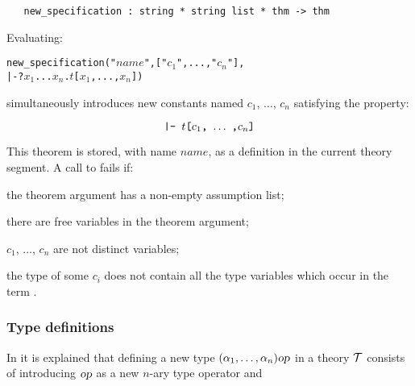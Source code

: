 \begin{holboxed}
\begin{verbatim}
   new_specification : string * string list * thm -> thm
\end{verbatim}
\end{holboxed}
%
Evaluating:
{
\newcommand{\cone}{\ensuremath{c_1}}
\newcommand{\cn}{\ensuremath{c_n}}
\newcommand{\xone}{\ensuremath{x_1}}
\newcommand{\xn}{\ensuremath{x_n}}
\begin{alltt}
   new_specification("\(\mathit{name}\)", ["\cone", ..., "\cn"],
                     |- ?\xone ... \xn. \(t\)[\xone, ..., \xn])
\end{alltt}
}
simultaneously  introduces  new constants  named $c_1$, $\dots$,
$c_n$ satisfying the property:

\[ \ml{|- }t\ml{[}c_1\ml{,}\ \ldots\ \ml{,}c_n\ml{]} \]

\noindent This theorem is stored,
with name $name$, as a definition in the current theory segment. A call to
 fails if:

\begin{myenumerate}
\item the theorem argument has a non-empty assumption list;
\item there are free variables in the theorem argument;
\item $c_1$, $\dots$, $c_n$ are not distinct variables;
\item the type of some $c_i$ does not contain all the type
variables which occur in the term
.
\end{myenumerate}
%

\subsubsection{Type definitions}
\label{type-defs}

%
%
In \LOGIC{} it is explained that
defining
%
%
a new type $(\alpha_1,\ldots,\alpha_n)\textsl{op}$ in a theory ${\cal T}$
consists of introducing $\textsl{op}$ as a new $n$-ary type operator and

